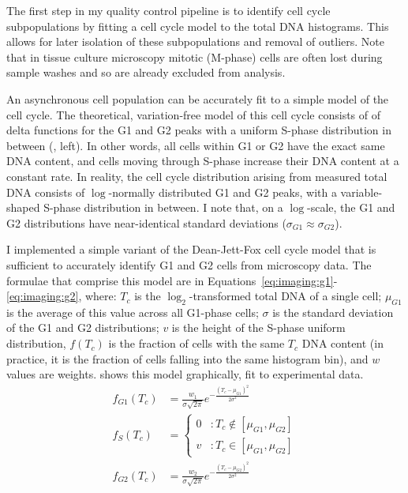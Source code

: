 The first step in my quality control pipeline is to identify cell cycle
subpopulations by fitting a cell cycle model
to the total DNA histograms. This allows for later isolation
of these subpopulations and removal of outliers. Note that
in tissue culture microscopy
mitotic (M-phase) cells are often lost during sample washes
and so are already excluded from analysis.


An asynchronous cell population can be accurately
fit to a simple model of the cell cycle. The
theoretical, variation-free model of this cell cycle
consists of of delta functions for the G1 and G2 peaks
with a uniform S-phase distribution in between
(, left). In other words, all
cells within G1 or G2 have the exact same DNA content,
and cells moving through S-phase increase their DNA content
at a constant rate. In reality,
the cell cycle distribution arising from measured
total DNA consists of $\log$-normally distributed G1
and G2 peaks, with a variable-shaped S-phase distribution
in between. I note that, on a $\log$-scale, the G1 and
G2 distributions have near-identical standard deviations
($\sigma_{G1}\approx\sigma_{G2}$).



I implemented a simple variant of the
Dean-Jett-Fox cell cycle model \cite{Dean1974,Fox1980}
that is sufficient to accurately identify G1 and G2 cells
from microscopy data.
The formulae that comprise this model are in
Equations~\ref{eq:imaging:g1}\nobreakdash-\ref{eq:imaging:g2},
where: $T_c$ is the $\log_2$-transformed
total DNA of a single cell; $\mu_{G1}$ is the average of this
value across all G1-phase cells; $\sigma$ is the standard
deviation of the G1 and G2 distributions; $v$ is the height of the S-phase
uniform distribution, $f(T_c)$ is the fraction of
cells with the same $T_c$ DNA content (in practice, it is the fraction of cells
falling into the same histogram bin), and $w$ values are weights.  shows
this model graphically, fit to experimental data.
    \begin{align}
    f_{G1}(T_c) &= \frac{w_1}{\sigma \sqrt{2\pi}}
    e^{-\frac{(T_c-\mu_{G1})^2}{2\sigma^2}} \label{eq:imaging:g1}\\
    f_{S} (T_c) &= \left\{
        \begin{array}{lr}
        0 & : T_c \notin [ \mu_{G1}, \mu_{G2} ] \\
        v & : T_c \in    [ \mu_{G1}, \mu_{G2} ]
        \end{array}
        \right.
    \label{eq:imaging:s}\\
    f_{G2}(T_c) &= \frac{w_2}{\sigma \sqrt{2\pi}}
    e^{-\frac{(T_c-\mu_{G2})^2}{2\sigma^2}} \label{eq:imaging:g2}
    \end{align}


